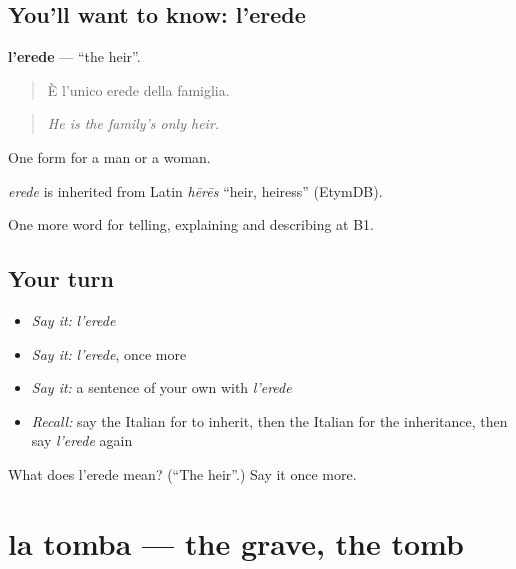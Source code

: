 \subsection*{You'll want to know: l'erede}
\textbf{l'erede} — \textquotedblleft{}the heir\textquotedblright{}.

\begin{quote}
È l'unico erede della famiglia.
\end{quote}

\begin{quote}
\emph{He is the family's only heir.}
\end{quote}

One form for a man or a woman.

\begin{cousinweb}
\emph{erede} is inherited from Latin \emph{hērēs} \textquotedblleft{}heir, heiress\textquotedblright{} (EtymDB).
\end{cousinweb}

\begin{grammarlens}[title={What you've built}]
One more word for telling, explaining and describing at B1.
\end{grammarlens}

\subsection*{Your turn}
\begin{itemize}
\raggedright
  \item \emph{Say it:} \emph{l'erede}
  \item \emph{Say it:} \emph{l'erede}, once more
  \item \emph{Say it:} a sentence of your own with \emph{l'erede}
  \item \emph{Recall:} say the Italian for to inherit, then the Italian for the inheritance, then say \emph{l'erede} again
\end{itemize}

\begin{tcolorbox}[breakable,colback=teal!4,colframe=teal!35!black,title={Before you move on}]
What does l'erede mean? (\textquotedblleft{}The heir\textquotedblright{}.) Say it once more.
\end{tcolorbox}
\section[la tomba]{la tomba — the grave, the tomb}

\label{lesson:IT-C314-tomba}



